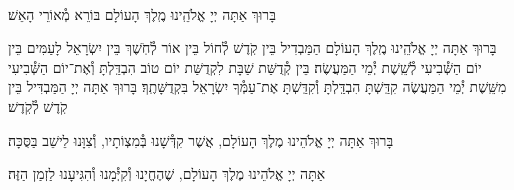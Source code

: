 \documentclass[twoside, openany, parskip=half, 11pt]{book}
\begin{document}
\begin{sometimes}

\\
בָּרוּךְ אַתָּה יְיָ אֱלֹהֵֽינוּ מֶֽלֶךְ הָעוֹלָם בּוֹרֵא מְ֯אוֹרֵי הָאֵשׁ׃

בָּרוּךְ אַתָּה יְיָ אֱלֹהֵֽינוּ מֶֽלֶךְ הָעוֹלָם הַמַּבְדִיל בֵּין קֹֽדֶשׁ לְ֯חוֹל בֵּין אוֹר לְ֯חֹֽשֶׁךְ בֵּין יִשְׂרָאֵל לָעַמִּים בֵּין יוֹם הַשְּׁ֯בִיעִי לְ֯שֵֽׁשֶׁת יְ֯מֵי הַמַּעֲשֶׂה׃ בֵּין קְ֯דֻשַּׁת שַׁבָּת לִקְדֻשַּׁת יוֹם טוֹב הִבְדַּֽלְתָּ וְ֯אֶת־יוֹם הַשְּׁ֯בִיעִי מִשֵּֽׁשֶׁת יְ֯מֵי הַמַּעֲשֶׂה קִדַּֽשְׁתָּ הִבְדַּֽלְתָּ וְ֯קִדַּֽשְׁתָּ אֶת־עַמְּ֯ךָ יִשְׂרָאֵל בִּקְדֻשָּׁתֶֽךָ׃ בָּרוּךְ אַתָּה יְיָ הַמַּבְדִּיל בֵּין קֹֽדֶשׁ לְ֯קֹֽדֶשׁ׃

\end{sometimes}



\vspace{-.5\baselineskip}
בָּרוּךְ אַתָּה יְיָ אֱלֹהֵינוּ מֶלֶךְ הָעוֹלָם, אֲשֶׁר קִדְּ֯שָׁנוּ בְּ֯מִצְוֹתָיו, וְ֯צִוָּנוּ לֵישֵׁב בַּסֻּכָּה׃

אַתָּה יְיָ אֱלֹהֵינוּ מֶלֶךְ הָעוֹלָם, שֶׁהֶחֱיָנוּ וְ֯קִיְּ֯מָנוּ וְ֯הִגִּיעָנוּ לַזְמַן הַזֶּה׃


%
%
%
%
%
%
%
%
\end{document}
